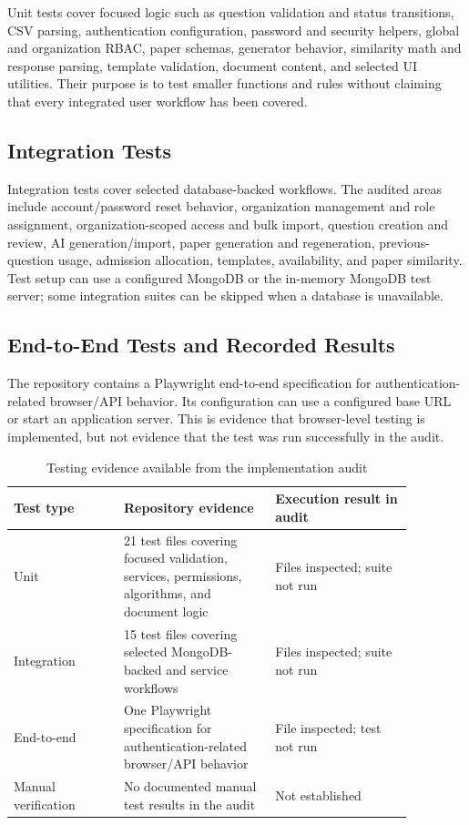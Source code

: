 Unit tests cover focused logic such as question validation and status transitions, CSV parsing, authentication configuration, password and security helpers, global and organization RBAC, paper schemas, generator behavior, similarity math and response parsing, template validation, document content, and selected UI utilities. Their purpose is to test smaller functions and rules without claiming that every integrated user workflow has been covered.

\subsection{Integration Tests}

Integration tests cover selected database-backed workflows. The audited areas include account/password reset behavior, organization management and role assignment, organization-scoped access and bulk import, question creation and review, AI generation/import, paper generation and regeneration, previous-question usage, admission allocation, templates, availability, and paper similarity. Test setup can use a configured MongoDB or the in-memory MongoDB test server; some integration suites can be skipped when a database is unavailable.

\subsection{End-to-End Tests and Recorded Results}

The repository contains a Playwright end-to-end specification for authentication-related browser/API behavior. Its configuration can use a configured base URL or start an application server. This is evidence that browser-level testing is implemented, but not evidence that the test was run successfully in the audit.

\begin{table}[H]
    \centering
    \caption{Testing evidence available from the implementation audit}
    \label{tab:ch4-testing-evidence}
    \begin{tabular}{|p{0.24\linewidth}|p{0.33\linewidth}|p{0.30\linewidth}|}
        \hline
        \textbf{Test type} & \textbf{Repository evidence} & \textbf{Execution result in audit} \\
        \hline
        Unit & 21 test files covering focused validation, services, permissions, algorithms, and document logic & Files inspected; suite not run \\
        \hline
        Integration & 15 test files covering selected MongoDB-backed and service workflows & Files inspected; suite not run \\
        \hline
        End-to-end & One Playwright specification for authentication-related browser/API behavior & File inspected; test not run \\
        \hline
        Manual verification & No documented manual test results in the audit & Not established \\
        \hline
    \end{tabular}
\end{table}

